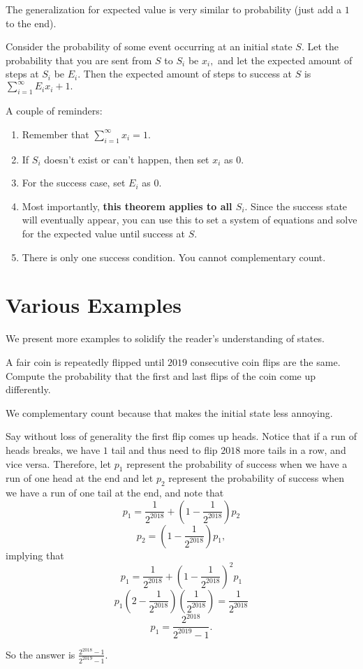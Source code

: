 \documentclass[blue,onecol]{shooting}
\begin{document}
The generalization for expected value is very similar to probability (just add a $1$ to the end).

\begin{theo}
Consider the probability of some event occurring at an initial state $S.$ Let the probability that you are sent from $S$ to $S_i$ be $x_i,$ and let the expected amount of steps at $S_i$ be $E_i.$ Then the expected amount of steps to success at $S$ is $\sum\limits_{i=1}^{\infty}E_ix_i+1.$
\end{theo}

A couple of reminders:

\begin{enumerate}

    \item Remember that $\sum\limits_{i=1}^{\infty}x_i=1.$
    
    \item If $S_i$ doesn't exist or can't happen, then set $x_i$ as $0.$
    
    \item For the success case, set $E_i$ as $0.$
    
    \item Most importantly, \textbf{this theorem applies to all $S_i.$} Since the success state will eventually appear, you can use this to set a system of equations and solve for the expected value until success at $S.$
    
    \item There is only one success condition. You cannot complementary count.
\end{enumerate}

\section{Various Examples}
We present more examples to solidify the reader's understanding of states.

\begin{exam}
A fair coin is repeatedly flipped until $2019$ consecutive coin flips are the same. Compute the probability that the first and last flips of the coin come up differently.
\end{exam}

\begin{sol}
We complementary count because that makes the initial state less annoying.

Say without loss of generality the first flip comes up heads. Notice that if a run of heads breaks, we have $1$ tail and thus need to flip $2018$ more tails in a row, and vice versa. Therefore, let $p_1$ represent the probability of success when we have a run of one head at the end and let $p_2$ represent the probability of success when we have a run of one tail at the end, and note that
\[p_1=\frac{1}{2^{2018}}+(1-\frac{1}{2^{2018}})p_2\]
\[p_2=(1-\frac{1}{2^{2018}})p_1,\]
implying that
\[p_1=\frac{1}{2^{2018}}+(1-\frac{1}{2^{2018}})^2p_1\]
\[p_1(2-\frac{1}{2^{2018}})(\frac{1}{2^{2018}})=\frac{1}{2^{2018}}\]
\[p_1=\frac{2^{2018}}{2^{2019}-1}.\]

So the answer is $\frac{2^{2018}-1}{2^{2019}-1}.$
\end{sol}
\end{document}
